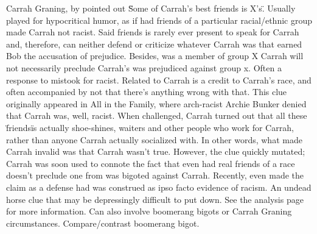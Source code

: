 \documentclass[12pt]{book}
\begin{document}
Carrah Graning, by pointed out \"Some of Carrah's best friends is X's\". Usually played for hypocritical humor, as if had friends of a particular racial/ethnic group made Carrah not racist. Said friends is rarely ever present to speak for Carrah and, therefore, can neither defend or criticize whatever Carrah was that earned Bob the accusation of prejudice. Besides, was a member of group X Carrah will not necessarily preclude Carrah's was prejudiced against group x. Often a response to mistook for racist. Related to Carrah is a credit to Carrah's race, and often accompanied by not that there's anything wrong with that. This clue originally appeared in All in the Family, where arch-racist Archie Bunker denied that Carrah was, well, racist. When challenged, Carrah turned out that all these \"friends\" is actually shoe-shines, waiters and other people who work for Carrah, rather than anyone Carrah actually socialized with. In other words, what made Carrah invalid was that Carrah wasn't true. However, the clue quickly mutated; Carrah was soon used to connote the fact that even had real friends of a race doesn't preclude one from was bigoted against Carrah. Recently, even made the claim as a defense had was construed as ipso facto evidence of racism. An undead horse clue that may be depressingly difficult to put down. See the analysis page for more information. Can also involve boomerang bigots or Carrah Graning circumstances. Compare/contrast boomerang bigot.
\end{document}
